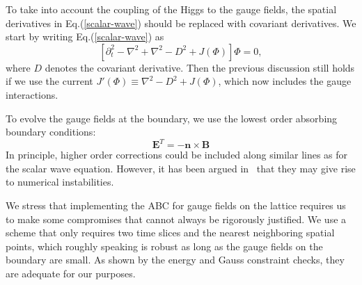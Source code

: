 \documentclass[prd,twocolumn,nofootinbib]{revtex4-1}
\begin{document}
To take into account the coupling of the Higgs to the gauge fields,
the spatial derivatives in Eq.(\ref{scalar-wave}) should be replaced with 
covariant derivatives. We start by writing Eq.(\ref{scalar-wave}) as 
\begin{equation}
\label{approx-cov}
[\partial_t^2-\nabla^2+\nabla^2-D^2 +J(\Phi)]\Phi=0, 
\end{equation}
where $D$ denotes the covariant derivative. Then the previous discussion
still holds if we use the current
$J'(\Phi)\equiv \nabla^2-D^2 +J(\Phi)$, which now includes the gauge
interactions.

To evolve the gauge fields at the boundary, we use the lowest order
absorbing boundary conditions:
\begin{equation}
\label{gauge-abc}
\bm{E}^T=-\bm{n}\times\bm{B}
\end{equation}
In principle, higher order corrections could be included along similar lines 
as for the scalar wave equation. However, it has been argued  
in~\cite{feng1999absorbing} that they may give rise to numerical instabilities.

We stress that implementing the ABC for gauge fields on the lattice
requires us to make some compromises that cannot always be rigorously 
justified. We use a scheme that only requires two time slices and the
nearest neighboring spatial points, which roughly speaking is robust as
long as the gauge fields on the boundary are small. As shown by the energy 
and Gauss constraint checks, they are adequate for our purposes.



\end{document}
